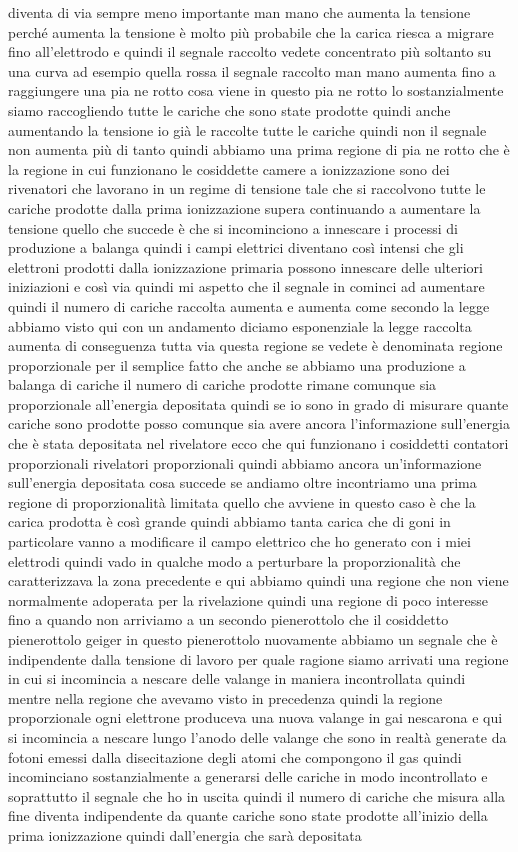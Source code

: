 {diventa di via sempre meno importante man mano che aumenta la tensione perché aumenta la tensione è molto più probabile che la carica riesca a migrare fino all'elettrodo e quindi il segnale raccolto vedete concentrato più soltanto su una curva ad esempio quella rossa il segnale raccolto man mano aumenta fino a raggiungere una pia ne rotto cosa viene in questo pia ne rotto lo sostanzialmente siamo raccogliendo tutte le cariche che sono state prodotte quindi anche aumentando la tensione io già le raccolte tutte le cariche quindi non il segnale non aumenta più di tanto quindi abbiamo una prima regione di pia ne rotto che è la regione in cui funzionano le cosiddette camere a ionizzazione sono dei rivenatori che lavorano in un regime di tensione tale che si raccolvono tutte le cariche prodotte dalla prima ionizzazione supera continuando a aumentare la tensione quello che succede è che si incominciono a innescare i processi di produzione a balanga quindi i campi elettrici diventano così intensi che gli elettroni prodotti dalla ionizzazione primaria possono innescare delle ulteriori iniziazioni e così via quindi mi aspetto che il segnale in cominci ad aumentare quindi il numero di cariche raccolta aumenta e aumenta come secondo la legge abbiamo visto qui con un andamento diciamo esponenziale la legge raccolta aumenta di conseguenza tutta via questa regione se vedete è denominata regione proporzionale per il semplice fatto che anche se abbiamo una produzione a balanga di cariche il numero di cariche prodotte rimane comunque sia proporzionale all'energia depositata quindi se io sono in grado di misurare quante cariche sono prodotte posso comunque sia avere ancora l'informazione sull'energia che è stata depositata nel rivelatore ecco che qui funzionano i cosiddetti contatori proporzionali rivelatori proporzionali quindi abbiamo ancora un'informazione sull'energia depositata cosa succede se andiamo oltre incontriamo una prima regione di proporzionalità limitata quello che avviene in questo caso è che la carica prodotta è così grande quindi abbiamo tanta carica che di goni in particolare vanno a modificare il campo elettrico che ho generato con i miei elettrodi quindi vado in qualche modo a perturbare la proporzionalità che caratterizzava la zona precedente e qui abbiamo quindi una regione che non viene normalmente adoperata per la rivelazione quindi una regione di poco interesse fino a quando non arriviamo a un secondo pienerottolo che il cosiddetto pienerottolo geiger in questo pienerottolo nuovamente abbiamo un segnale che è indipendente dalla tensione di lavoro per quale ragione siamo arrivati una regione in cui si incomincia a nescare delle valange in maniera incontrollata quindi mentre nella regione che avevamo visto in precedenza quindi la regione proporzionale ogni elettrone produceva una nuova valange in gai nescarona e qui si incomincia a nescare lungo l'anodo delle valange che sono in realtà generate da fotoni emessi dalla disecitazione degli atomi che compongono il gas quindi incominciano sostanzialmente a generarsi delle cariche in modo incontrollato e soprattutto il segnale che ho in uscita quindi il numero di cariche che misura alla fine diventa indipendente da quante cariche sono state prodotte all'inizio della prima ionizzazione quindi dall'energia che sarà depositata }

